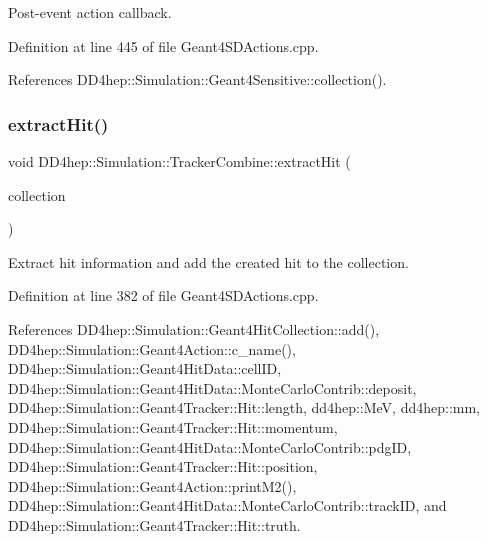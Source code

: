 Post-\/event action callback. 



Definition at line 445 of file Geant4\+S\+D\+Actions.\+cpp.



References D\+D4hep\+::\+Simulation\+::\+Geant4\+Sensitive\+::collection().

\hypertarget{struct_d_d4hep_1_1_simulation_1_1_tracker_combine_a75803adf3212ecca99d2b6fbcd53899f}{}\label{struct_d_d4hep_1_1_simulation_1_1_tracker_combine_a75803adf3212ecca99d2b6fbcd53899f} 
\subsubsection{\texorpdfstring{extract\+Hit()}{extractHit()}}
{\footnotesize\ttfamily void D\+D4hep\+::\+Simulation\+::\+Tracker\+Combine\+::extract\+Hit (\begin{DoxyParamCaption}\item[{\hyperlink{class_d_d4hep_1_1_simulation_1_1_geant4_hit_collection}{Geant4\+Hit\+Collection} $\ast$}]{collection }\end{DoxyParamCaption})\hspace{0.3cm}{\ttfamily [inline]}}



Extract hit information and add the created hit to the collection. 



Definition at line 382 of file Geant4\+S\+D\+Actions.\+cpp.



References D\+D4hep\+::\+Simulation\+::\+Geant4\+Hit\+Collection\+::add(), D\+D4hep\+::\+Simulation\+::\+Geant4\+Action\+::c\+\_\+name(), D\+D4hep\+::\+Simulation\+::\+Geant4\+Hit\+Data\+::cell\+ID, D\+D4hep\+::\+Simulation\+::\+Geant4\+Hit\+Data\+::\+Monte\+Carlo\+Contrib\+::deposit, D\+D4hep\+::\+Simulation\+::\+Geant4\+Tracker\+::\+Hit\+::length, dd4hep\+::\+MeV, dd4hep\+::mm, D\+D4hep\+::\+Simulation\+::\+Geant4\+Tracker\+::\+Hit\+::momentum, D\+D4hep\+::\+Simulation\+::\+Geant4\+Hit\+Data\+::\+Monte\+Carlo\+Contrib\+::pdg\+ID, D\+D4hep\+::\+Simulation\+::\+Geant4\+Tracker\+::\+Hit\+::position, D\+D4hep\+::\+Simulation\+::\+Geant4\+Action\+::print\+M2(), D\+D4hep\+::\+Simulation\+::\+Geant4\+Hit\+Data\+::\+Monte\+Carlo\+Contrib\+::track\+ID, and D\+D4hep\+::\+Simulation\+::\+Geant4\+Tracker\+::\+Hit\+::truth.

